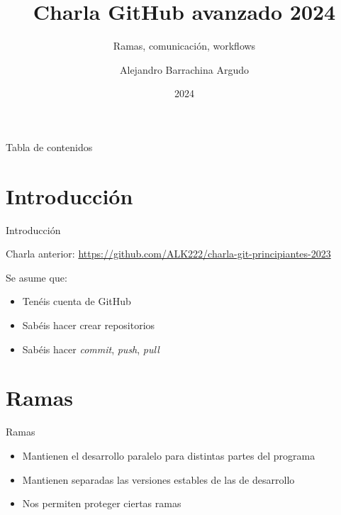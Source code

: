 \documentclass{beamer}
\title{Charla GitHub avanzado 2024}
\subtitle{Ramas, comunicación, workflows}
\date{2024}
\author{Alejandro Barrachina Argudo}
\institute{Universidad Complutense de Madrid}
\begin{document}
\maketitle

\begin{frame}{Tabla de contenidos}
    \tableofcontents
\end{frame}

\section{Introducción}
\begin{frame}{Introducción}

    Charla anterior: \url{https://github.com/ALK222/charla-git-principiantes-2023}
    
    Se asume que:
    \begin{itemize}
        \item Tenéis cuenta de GitHub
        \item Sabéis hacer crear repositorios
        \item Sabéis hacer \textit{commit}, \textit{push}, \textit{pull}
    \end{itemize}
\end{frame}

\section{Ramas}
\begin{frame}{Ramas}
    \begin{itemize}
    \item Mantienen el desarrollo paralelo para distintas partes del programa

    \item Mantienen separadas las versiones estables de las de desarrollo
     
    \item Nos permiten proteger ciertas ramas
\end{itemize}

\end{frame}
\end{document}

